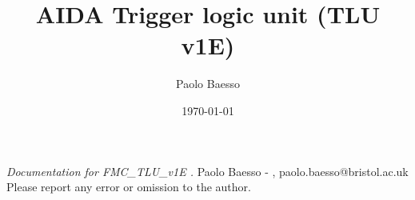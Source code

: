 \documentclass[10pt,twoside, fleqn]{memoir}
\author{Paolo Baesso}
\title{AIDA Trigger logic unit (TLU v1E)}
\date{\today}
\makeatletter
\def\maketitle{%
  \null
  \thispagestyle{empty}%
  \vfill
  \begin{center}\leavevmode
    \normalfont
    {\LARGE\raggedleft \@author\par}%
    \hrulefill\par
    {\huge\raggedright \@title\par}%
    \vskip 1cm
  {\Large \@date\par}%
  \end{center}%
  \vfill
  \null
  \cleardoublepage
  }
\makeatother
\begin{document}
\def\brd{FMC\_TLU\_v1E }
\def\oldbrd{FMC\_TLU\_v1C }

\let\cleardoublepage\clearpage


\maketitle
\frontmatter

\null\vfill
\begin{flushleft}
\textit{Documentation for \brd.}\newline
\newline
Paolo Baesso - \monthname,   \the\year
\newline paolo.baesso@bristol.ac.uk
\newline
\newline Please report any error or omission to the author.
\bigskip

\end{flushleft}
\let\cleardoublepage\clearpage

\newpage
\tableofcontents

\mainmatter
\sloppy

\newenvironment{SpecialPar}
  {\begin{shaded}\noindent}
  {\end{shaded}}




%

















%


\printglossaries
\printglossary[type=\acronymtype,title=Abbreviations]

%
%
\end{document}
